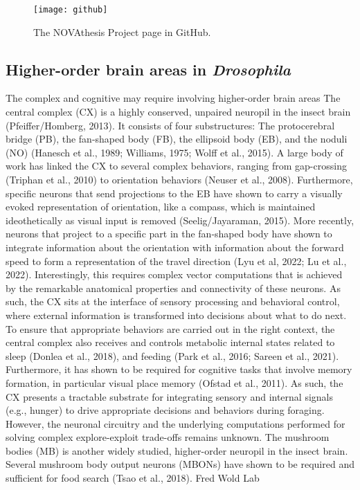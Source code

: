 \begin{wrapfigure}{r}{0.3\linewidth}
\vspace*{-17ex}
\texttt{[image: github]}%
\caption{The NOVAthesis Project page in GitHub.}
\label{fig:github2}
\end{wrapfigure}

\subsection{Higher-order brain areas in \textit{Drosophila}}
\label{sub:foodcogn}

The complex and cognitive may require involving higher-order brain areas
The central complex (CX) is a highly conserved, unpaired neuropil in the insect brain \needscite(Pfeiffer/Homberg, 2013). It consists of four substructures: The protocerebral bridge (PB), the fan-shaped body (FB), the ellipsoid body (EB), and the noduli (NO) \needscite(Hanesch et al., 1989; Williams, 1975; Wolff et al., 2015). A large body of work has linked the CX to several complex behaviors, ranging from gap-crossing \needscite(Triphan et al., 2010) to orientation behaviors \needscite(Neuser et al., 2008). Furthermore, specific neurons that send projections to the EB have shown to carry a visually evoked representation of orientation, like a compass, which is maintained ideothetically as visual input is removed \needscite(Seelig/Jayaraman, 2015). More recently, neurons that project to a specific part in the fan-shaped body have shown to integrate information about the orientation with information about the forward speed to form a representation of the travel direction \needscite(Lyu et al, 2022; Lu et al., 2022). Interestingly, this requires complex vector computations that is achieved by the remarkable anatomical properties and connectivity of these neurons.
As such, the CX sits at the interface of sensory processing and behavioral control, where external information is transformed into decisions about what to do next. To ensure that appropriate behaviors are carried out in the right context, the central complex also receives and controls metabolic internal states related to sleep \needscite(Donlea et al., 2018), and feeding \needscite(Park et al., 2016; Sareen et al., 2021). Furthermore, it has shown to be required for cognitive tasks that involve memory formation, in particular visual place memory \needscite(Ofstad et al., 2011). As such, the CX presents a tractable substrate for integrating sensory and internal signals (e.g., hunger) to drive appropriate decisions and behaviors during foraging. However, the neuronal circuitry and the underlying computations performed for solving complex explore-exploit trade-offs remains unknown.
The mushroom bodies (MB) is another widely studied, higher-order neuropil in the insect brain.
Several mushroom body output neurons (MBONs) have shown to be required and sufficient for food search \needscite(Tsao et al., 2018). Fred Wold Lab

